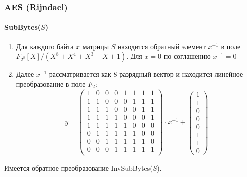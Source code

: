 \begin{frame}
    \frametitle{AES (Rijndael)}
    \framesubtitle{SubBytes($S$)}
    
    \begin{enumerate}
        \item Для каждого байта $x$ матрицы $S$ находится обратный элемент $x^{-1}$ в поле $F_{2^8}[X]/(X^8+X^4+X^3+X+1)$. Для $x=0$ по соглашению $x^{-1}=0$
        \item Далее $x^{-1}$ рассматривается как 8-разрядный вектор и находится линейное преобразование в поле $F_2$:
        \[
            y=
            \begin{pmatrix}
                1&0&0&0&1&1&1&1\\
                1&1&0&0&0&1&1&1\\
                1&1&1&0&0&0&1&1\\
                1&1&1&1&0&0&0&1\\
                1&1&1&1&1&0&0&0\\
                0&1&1&1&1&1&0&0\\
                0&0&1&1&1&1&1&0\\
                0&0&0&1&1&1&1&1\\
            \end{pmatrix}\cdot x^{-1} + 
            \begin{pmatrix}
                1\\
                1\\
                0\\
                0\\
                0\\
                1\\
                1\\
                0
            \end{pmatrix}
        \]
    \end{enumerate}
    Имеется обратное преобразование InvSubBytes($S$).
\end{frame}


